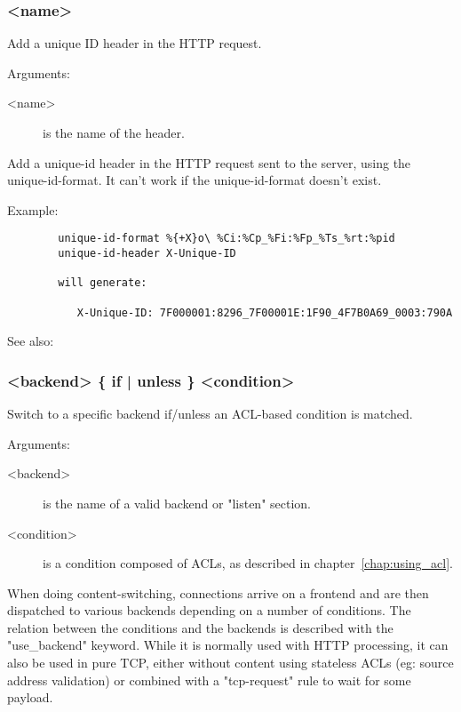\subsubsection[unique-id-header]{ <name>}

  Add a unique ID header in the HTTP request.


  Arguments:
  \begin{description}
  \item[<name>] is the name of the header.
  \end{description}

  Add a unique-id header in the HTTP request sent to the server, using the
  unique-id-format. It can't work if the unique-id-format doesn't exist.

  Example:
\begin{verbatim}
        unique-id-format %{+X}o\ %Ci:%Cp_%Fi:%Fp_%Ts_%rt:%pid
        unique-id-header X-Unique-ID

        will generate:

           X-Unique-ID: 7F000001:8296_7F00001E:1F90_4F7B0A69_0003:790A
\end{verbatim}

See also: 

\subsubsection[use\_backend]{ <backend> \{ if | unless \} <condition>}


  Switch to a specific backend if/unless an ACL-based condition is matched.


  Arguments:
  \begin{description}
  \item[<backend>] is the name of a valid backend or "listen" section.
  \item[<condition>] is a condition composed of ACLs, as described in chapter~\ref{chap:using_acl}.
  \end{description}

  When doing content-switching, connections arrive on a frontend and are then
  dispatched to various backends depending on a number of conditions. The
  relation between the conditions and the backends is described with the
  "use\_backend" keyword. While it is normally used with HTTP processing, it can
  also be used in pure TCP, either without content using stateless ACLs (eg:
  source address validation) or combined with a "tcp-request" rule to wait for
  some payload.

